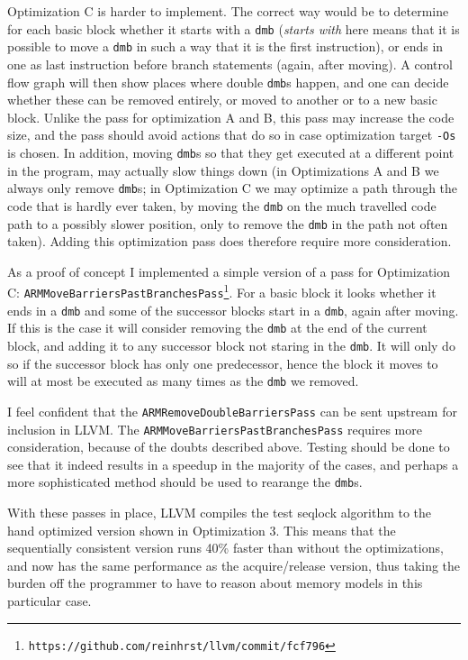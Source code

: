 \documentclass[journal]{IEEEtran}
\begin{document}
Optimization C is harder to implement.
The correct way would be to determine for each basic block whether it starts with a \texttt{dmb} (\emph{starts with} here means that it is possible to move a \texttt{dmb} in such a way that it is the first instruction), or ends in one as last instruction before branch statements (again, after moving).
A control flow graph will then show places where double \texttt{dmb}s happen, and one can decide whether these can be removed entirely, or moved to another or to a new basic block.
Unlike the pass for optimization A and B, this pass may increase the code size, and the pass should avoid actions that do so in case optimization target \texttt{-Os} is chosen.
In addition, moving \texttt{dmb}s so that they get executed at a different point in the program, may actually slow things down (in Optimizations A and B we always only remove \texttt{dmb}s; in Optimization C we may optimize a path through the code that is hardly ever taken, by moving the \texttt{dmb} on the much travelled code path to a possibly slower position, only to remove the \texttt{dmb} in the path not often taken).
Adding this optimization pass does therefore require more consideration.

As a proof of concept I implemented a simple version of a pass for Optimization C:
\texttt{ARM\-Move\-Barriers\-Past\-Branches\-Pass}\footnote{\texttt{https://github.com/reinhrst/llvm/commit/fcf796}}.
For a basic block it looks whether it ends in a \texttt{dmb} and some of the successor blocks start in a \texttt{dmb}, again after moving.
If this is the case it will consider removing the \texttt{dmb} at the end of the current block, and adding it to any successor block not staring in the \texttt{dmb}.
It will only do so if the successor block has only one predecessor, hence the block it moves to will at most be executed as many times as the \texttt{dmb} we removed.

I feel confident that the \texttt{ARM\-Remove\-Double\-Barriers\-Pass} can be sent upstream for inclusion in LLVM.
The \texttt{ARM\-Move\-Barriers\-Past\-Branches\-Pass} requires more consideration, because of the doubts described above.
Testing should be done to see that it indeed results in a speedup in the majority of the cases, and perhaps a more sophisticated method should be used to rearange the \texttt{dmb}s.

With these passes in place, LLVM compiles the test seqlock algorithm to the hand optimized version shown in Optimization 3.
This means that the sequentially consistent version runs 40\% faster than without the optimizations, and now has the same performance as the acquire/release version, thus taking the burden off the programmer to have to reason about memory models in this particular case.
\end{document}
